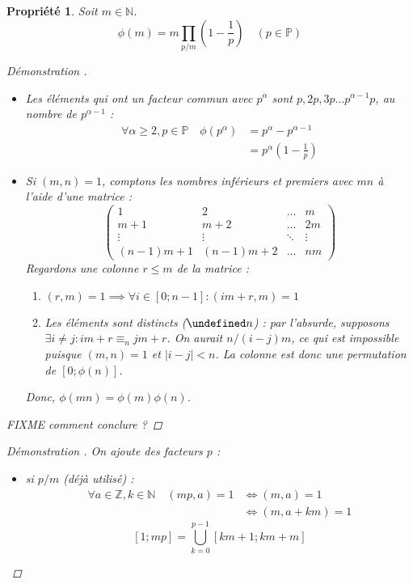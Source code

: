 \documentclass[11pt,twocolumn]{article}
\let\mod\undefined
\DeclareMathOperator{\mod}{mod}
\theoremstyle{plain}
\newtheorem{pr}{Propriété}
\newcommand{\esP}{\mathbb{P}} %
\newcommand{\esN}{\mathbb{N}} %
\newcommand{\esZ}{\mathbb{Z}} %
\newcommand{\dbi}{\Longleftrightarrow}
\newenvironment{cproof}[1]{\begin{proof}[Démonstration \cite{#1}]}{\end{proof}}
\begin{document}
\begin{pr}
	Soit $m \in \esN$. \[
		\phi(m) = m \left.\prod_{p/m} \left(1 - \frac1p\right)\right.
		\quad (p \in \esP)
	\]
	\begin{cproof}{Buys} ~
		\begin{itemize}
			\item Les éléments qui ont un facteur commun avec $p^\alpha$ sont
				$p, 2p, 3p \dots p^{\alpha-1}p$, au nombre de $p^{\alpha-1}$ :
				\begin{align*}
					\forall \alpha \geq 2, p \in \esP \quad
					\phi\left(p^\alpha\right)
					&= p^\alpha - p^{\alpha-1} \\
					&= p^\alpha\left(1-\frac1p\right)
				\end{align*}
			\item Si $(m,n)=1$, comptons les nombres
				inférieurs et premiers avec $mn$ à l'aide d'une matrice : \[
					\left(\begin{array}{llll}
						1 & 2 & \dots & m \\
						m+1 & m+2 & \dots & 2m \\
						\vdots & \vdots & \ddots & \vdots \\
						(n-1)m+1 & (n-1)m+2 & \dots & nm
					\end{array}\right)
				\]
				Regardons une colonne $r \leq m$ de la matrice :
				\begin{enumerate}
					\item $(r,m)=1 \implies \forall i \in [0;n-1] : (im+r,m)=1$
					\item Les éléments sont distincts ($\mod n$) :
						par l'absurde,
						supposons $\exists i \neq j : im+r \equiv_n jm+r$.
						On aurait $n/\left(i-j\right)m$, ce qui est impossible
						puisque $(m,n)=1$ et $\left|i-j\right|<n$.
						La colonne est donc une permutation de $[0;\phi(n)]$.
				\end{enumerate}
				Donc, $\phi(mn)=\phi(m)\phi(n)$.
		\end{itemize}
		FIXME comment conclure ?
	\end{cproof}
	\begin{cproof}{Buys}
		On ajoute des facteurs $p$ :
		\begin{itemize}
			\item si $p/m$ (déjà utilisé) :
				\begin{align*}
					\forall a \in \esZ, k \in \esN \quad (mp,a)=1
					&\dbi (m,a)=1 \\
					&\dbi (m,a+km)=1
				\end{align*}
				\[
					[1;mp] = \bigcup_{k=0}^{p-1}[km+1;km+m]
\]
\end{itemize}
\end{cproof}
\end{pr}
\end{document}
